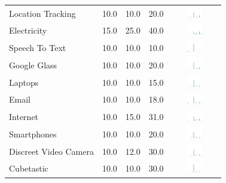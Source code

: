 \begin{table}[t]
\begin{center}
\begin{tabular}{| p{2cm} | p{1cm} | p{1cm} | p{1cm} | c |}
Location Tracking  & 10.0 & 10.0 & 20.0 & \includegraphics[width = 2cm, height = 0.5cm]{../locationtrackingrisk} \\ 
Electricity & 15.0 & 25.0 & 40.0 & \includegraphics[width = 2cm, height = 0.5cm]{../ElectricityRisk} \\ 
Speech To Text  & 10.0 & 10.0 & 10.0 & \includegraphics[width = 2cm, height = 0.5cm]{../speechtotextrisk} \\ 
Google Glass  & 10.0 & 10.0 & 20.0 & \includegraphics[width = 2cm, height = 0.5cm]{../googleglassrisk} \\ 
Laptops  & 10.0 & 10.0 & 15.0 & \includegraphics[width = 2cm, height = 0.5cm]{../laptopsrisk} \\ 
Email  & 10.0 & 10.0 & 18.0 & \includegraphics[width = 2cm, height = 0.5cm]{../emailrisk} \\ 
Internet  & 10.0 & 15.0 & 31.0 & \includegraphics[width = 2cm, height = 0.5cm]{../internetrisk} \\ 
Smartphones  & 10.0 & 10.0 & 20.0 & \includegraphics[width = 2cm, height = 0.5cm]{../smartphonesrisk} \\ 
Discreet Video Camera  & 10.0 & 12.0 & 30.0 & \includegraphics[width = 2cm, height = 0.5cm]{../discreetvideocamerarisk} \\ 
Cubetastic  & 10.0 & 10.0 & 30.0 & \includegraphics[width = 2cm, height = 0.5cm]{../cubetasticrisk} \\ 

\end{tabular}
\end{center}
\end{table}
